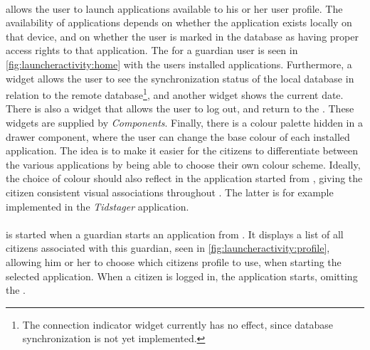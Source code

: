 \paragraph{\homeactivity} allows the user to launch \giraf applications available to his or her user profile. 
The availability of applications depends on whether the application exists locally on that device, and on whether the user is marked in the database as having proper access rights to that application.
The \homeactivity for a guardian user is seen in \cref{fig:launcheractivity:home} with the users installed \giraf applications.
Furthermore, a widget allows the user to see the synchronization status of the local database in relation to the remote database\footnote{The connection indicator widget currently has no effect, since database synchronization is not yet implemented.}, and another widget shows the current date.
There is also a widget that allows the user to log out, and return to the \authenticationactivity.
These widgets are supplied by \textit{\giraf Components}.
Finally, there is a colour palette hidden in a drawer component, where the user can change the base colour of each installed application.
The idea is to make it easier for the citizens to differentiate between the various applications by being able to choose their own colour scheme. 
Ideally, the choice of colour should also reflect in the application started from \launcher, giving the citizen consistent visual associations throughout \giraf.
The latter is for example implemented in the \textit{Tidstager} application.

\paragraph{\profileselectionactivity} is started when a guardian starts an application from \launcher. 
It displays a list of all citizens associated with this guardian, seen in \cref{fig:launcheractivity:profile}, allowing him or her to choose which citizens profile to use, when starting the selected application. 
When a citizen is logged in, the application starts, omitting the \profileselectionactivity.